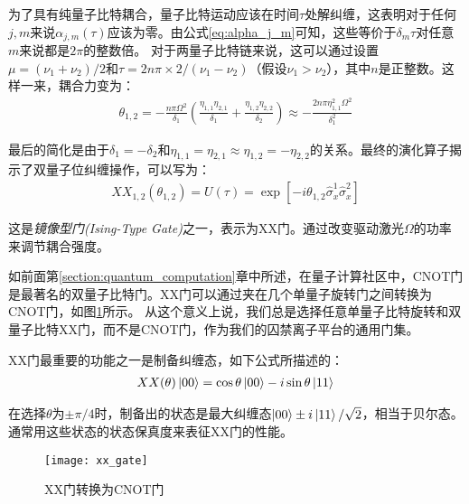 为了具有纯量子比特耦合，量子比特运动应该在时间$\tau$处解纠缠，这表明对于任何$j,m$来说$\alpha_{j,m}(\tau)$应该为零。由公式\eqref{eq:alpha_j_m}可知，这些等价于$\delta_m\tau$对任意$m$来说都是$2\pi$的整数倍。
对于两量子比特链来说，这可以通过设置$\mu=(\nu_1+\nu_2)/2$和$\tau=2n\pi\times2/(\nu_1-\nu_2)$（假设$\nu_1>\nu_2$），其中$n$是正整数。这样一来，耦合力变为：
\begin{align}
    \theta_{1,2}=-\frac{n\pi\Omega^2}{\delta_1}\left(\frac{\eta_{1,1}\eta_{2,1}}{\delta_1}+\frac{\eta_{1,2}\eta_{2,2}}{\delta_2}\right)\approx-\frac{2n\pi\eta_{1,1}^2\Omega^2}{\delta_1^2}
\end{align}

最后的简化是由于$\delta_1=-\delta_2$和$\eta_{1,1}=\eta_{2,1}\approx\eta_{1,2}=-\eta_{2,2}$的关系。最终的演化算子揭示了双量子位纠缠操作，可以写为：
\begin{align}
    XX_{1,2}(\theta_{1,2})=U(\tau)=\exp[-i\theta_{1,2}\hat{\sigma}_x^1\hat{\sigma}_x^2]
\end{align}

这是\emph{镜像型门(Ising-Type Gate)}之一，表示为XX门。通过改变驱动激光$\Omega$的功率来调节耦合强度。

如前面第\ref{section:quantum_computation}章中所述，在量子计算社区中，CNOT门是最著名的双量子比特门。XX门可以通过夹在几个单量子旋转门之间转换为CNOT门\cite[]{Debnath_Linke_Figgatt_Landsman_Wright_Monroe_2016}，如图\ref{fig:xx_gate}所示。
从这个意义上说，我们总是选择任意单量子比特旋转和双量子比特XX门，而不是CNOT门，作为我们的囚禁离子平台的通用门集。


XX门最重要的功能之一是制备纠缠态，如下公式所描述的：
\begin{align}
    XX(\theta)\ket{00}=\cos\theta\ket{00}-i\sin\theta\ket{11}
\end{align}

在选择$\theta$为$\pm\pi/4$时，制备出的状态是最大纠缠态$\ket{00}\pm i\ket{11}/\sqrt{2}$，相当于贝尔态。通常用这些状态的状态保真度来表征XX门的性能。

\begin{figure}
    \centering
    \caption[XX门转换为CNOT门]{XX门转换为CNOT门\label{fig:xx_gate}}
    \texttt{[image: xx\_gate]}
\end{figure}